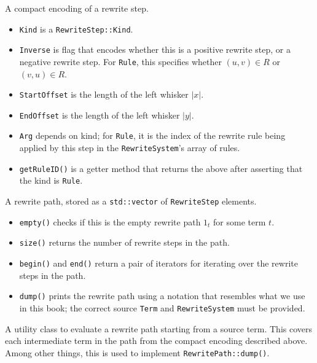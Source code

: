 \documentclass[../generics]{subfiles}
\begin{document}
A compact encoding of a rewrite step.
\begin{itemize}
\item \texttt{Kind} is a \texttt{RewriteStep::Kind}.
\item \texttt{Inverse} is flag that encodes whether this is a positive rewrite step, or a negative rewrite step. For \texttt{Rule}, this specifies whether $(u,v)\in R$ or $(v,u)\in R$.
\item \texttt{StartOffset} is the length of the left whisker $|x|$.
\item \texttt{EndOffset} is the length of the left whisker $|y|$.
\item \texttt{Arg} depends on kind; for \texttt{Rule}, it is the index of the rewrite rule being applied by this step in the \texttt{RewriteSystem}'s array of rules.
\item \texttt{getRuleID()} is a getter method that returns the above after asserting that the kind is \texttt{Rule}.
\end{itemize}

A rewrite path, stored as a \texttt{std::vector} of \texttt{RewriteStep} elements.

\begin{itemize}
\item \texttt{empty()} checks if this is the empty rewrite path $1_t$ for some term $t$.
\item \texttt{size()} returns the number of rewrite steps in the path.
\item \texttt{begin()} and \texttt{end()} return a pair of iterators for iterating over the rewrite steps in the path.
\item \texttt{dump()} prints the rewrite path using a notation that resembles what we use in this book; the correct source \texttt{Term} and \texttt{RewriteSystem} must be provided.
\end{itemize}

A utility class to evaluate a rewrite path starting from a source term. This covers each intermediate term in the path from the compact encoding described above. Among other things, this is used to implement \texttt{RewritePath::dump()}.
\end{document}
